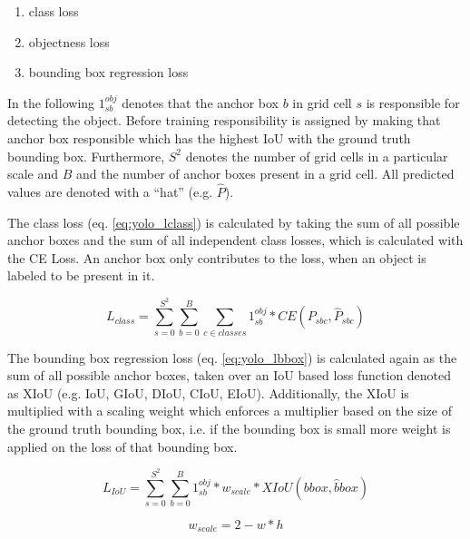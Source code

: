 \begin{enumerate}
    \item class loss
    \item objectness loss
    \item bounding box regression loss
\end{enumerate}

In the following $1_{sb}^{obj}$ denotes that the anchor box $b$ in grid cell $s$ is responsible for detecting the object.
Before training responsibility is assigned by making that anchor box responsible which has the highest \ac{IoU} with the ground truth bounding box.
Furthermore, $S^2$ denotes the number of grid cells in a particular scale and $B$ and the number of anchor boxes present in a grid cell.
All predicted values are denoted with a ``hat'' (e.g. $\hat{P}$).

The class loss (eq. \ref{eq:yolo_lclass}) is calculated by taking the sum of all possible anchor boxes and the sum of all independent class losses, which is calculated with the \ac{CE} Loss.
An anchor box only contributes to the loss, when an object is labeled to be present in it.

\begin{equation}
    L_{class} = \sum_{s=0}^{S^2} \sum_{b=0}^B \sum_{c \in classes} 1_{sb}^{obj} * CE(P_{sbc}, \hat{P}_{sbc})
    \label{eq:yolo_lclass}
\end{equation}

The bounding box regression loss (eq. \ref{eq:yolo_lbbox}) is calculated again as the sum of all possible anchor boxes, taken over an \ac{IoU} based loss function denoted as XIoU (e.g. \ac{IoU}, \ac{GIoU}, \ac{DIoU}, \ac{CIoU}, \ac{EIoU}).
Additionally, the XIoU is multiplied with a scaling weight which enforces a multiplier based on the size of the ground truth bounding box, i.e. if the bounding box is small more weight is applied on the loss of that bounding box.

\begin{equation}
    L_{IoU} = \sum_{s=0}^{S^2}\sum_{b=0}^{B} 1^{obj}_{sb} * w_{scale} * XIoU(bbox, \hat{b}box)
    \label{eq:yolo_lbbox}
\end{equation}

\begin{equation}
    w_{scale} = 2 - w * h
\end{equation}

